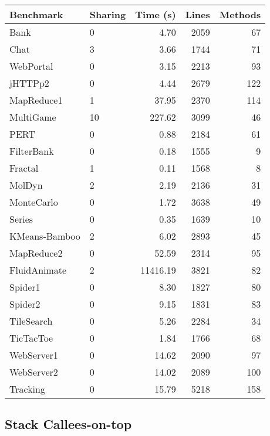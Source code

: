 \documentclass{amsart}[9pt]
\begin{document}
\begin{tabular}{|l|l|r|r|r|}
\hline
Benchmark & Sharing & Time (s) & Lines & Methods \\
\hline
Bank          & 0  & 4.70     & 2059 & 67 \\
Chat          & 3  & 3.66     & 1744 & 71 \\
WebPortal     & 0  & 3.15     & 2213 & 93 \\
jHTTPp2       & 0  & 4.44     & 2679 & 122 \\
MapReduce1    & 1  & 37.95    & 2370 & 114 \\
MultiGame     & 10 & 227.62   & 3099 & 46 \\
PERT          & 0  & 0.88     & 2184 & 61 \\
FilterBank    & 0  & 0.18     & 1555 & 9 \\
Fractal       & 1  & 0.11     & 1568 & 8 \\
MolDyn        & 2  & 2.19     & 2136 & 31 \\
MonteCarlo    & 0  & 1.72     & 3638 & 49 \\
Series        & 0  & 0.35     & 1639 & 10 \\
KMeans-Bamboo & 2  & 6.02     & 2893 & 45 \\
MapReduce2    & 0  & 52.59    & 2314 & 95 \\
FluidAnimate  & 2  & 11416.19 & 3821 & 82 \\
Spider1       & 0  & 8.30     & 1827 & 80 \\
Spider2       & 0  & 9.15     & 1831 & 83 \\
TileSearch    & 0  & 5.26     & 2284 & 34 \\
TicTacToe     & 0  & 1.84     & 1766 & 68 \\
WebServer1    & 0  & 14.62    & 2090 & 97 \\
WebServer2    & 0  & 14.02    & 2089 & 100 \\
Tracking      & 0  & 15.79    & 5218 & 158 \\
\hline
\end{tabular}



\subsection{Stack Callees-on-top}
\end{document}

